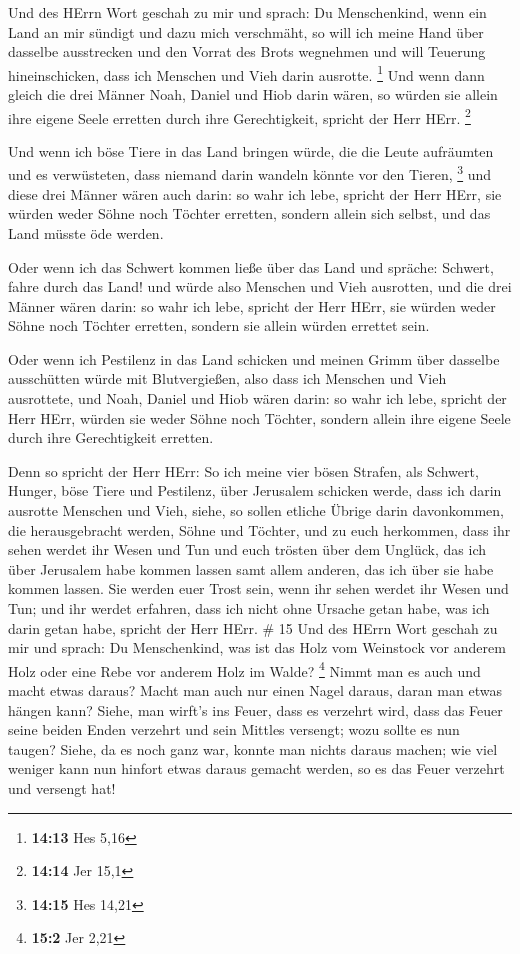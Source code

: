  Und des HErrn Wort geschah zu mir und sprach:
 Du Menschenkind, wenn ein Land an mir sündigt und dazu
mich verschmäht, so will ich meine Hand über dasselbe ausstrecken und
den Vorrat des Brots wegnehmen und will Teuerung hineinschicken, dass
ich Menschen und Vieh darin ausrotte. \footnote{\textbf{14:13} Hes 5,16}
 Und wenn dann gleich die drei Männer Noah, Daniel und Hiob
darin wären, so würden sie allein ihre eigene Seele erretten durch ihre
Gerechtigkeit, spricht der Herr HErr. \footnote{\textbf{14:14} Jer 15,1}

 Und wenn ich böse Tiere in das Land bringen würde, die die
Leute aufräumten und es verwüsteten, dass niemand darin wandeln könnte
vor den Tieren, \footnote{\textbf{14:15} Hes 14,21}  und
diese drei Männer wären auch darin: so wahr ich lebe, spricht der Herr
HErr, sie würden weder Söhne noch Töchter erretten, sondern allein sich
selbst, und das Land müsste öde werden.

 Oder wenn ich das Schwert kommen ließe über das Land und
spräche: Schwert, fahre durch das Land! und würde also Menschen und Vieh
ausrotten,  und die drei Männer wären darin: so wahr ich
lebe, spricht der Herr HErr, sie würden weder Söhne noch Töchter
erretten, sondern sie allein würden errettet sein.

 Oder wenn ich Pestilenz in das Land schicken und meinen
Grimm über dasselbe ausschütten würde mit Blutvergießen, also dass ich
Menschen und Vieh ausrottete,  und Noah, Daniel und Hiob
wären darin: so wahr ich lebe, spricht der Herr HErr, würden sie weder
Söhne noch Töchter, sondern allein ihre eigene Seele durch ihre
Gerechtigkeit erretten.

 Denn so spricht der Herr HErr: So ich meine vier bösen
Strafen, als Schwert, Hunger, böse Tiere und Pestilenz, über Jerusalem
schicken werde, dass ich darin ausrotte Menschen und Vieh, 
siehe, so sollen etliche Übrige darin davonkommen, die herausgebracht
werden, Söhne und Töchter, und zu euch herkommen, dass ihr sehen werdet
ihr Wesen und Tun und euch trösten über dem Unglück, das ich über
Jerusalem habe kommen lassen samt allem anderen, das ich über sie habe
kommen lassen.  Sie werden euer Trost sein, wenn ihr sehen
werdet ihr Wesen und Tun; und ihr werdet erfahren, dass ich nicht ohne
Ursache getan habe, was ich darin getan habe, spricht der Herr HErr. \#
15  Und des HErrn Wort geschah zu mir und sprach:
 Du Menschenkind, was ist das Holz vom Weinstock vor anderem
Holz oder eine Rebe vor anderem Holz im Walde? \footnote{\textbf{15:2}
  Jer 2,21}  Nimmt man es auch und macht etwas daraus? Macht
man auch nur einen Nagel daraus, daran man etwas hängen kann?
 Siehe, man wirft's ins Feuer, dass es verzehrt wird, dass
das Feuer seine beiden Enden verzehrt und sein Mittles versengt; wozu
sollte es nun taugen?  Siehe, da es noch ganz war, konnte
man nichts daraus machen; wie viel weniger kann nun hinfort etwas daraus
gemacht werden, so es das Feuer verzehrt und versengt hat!

